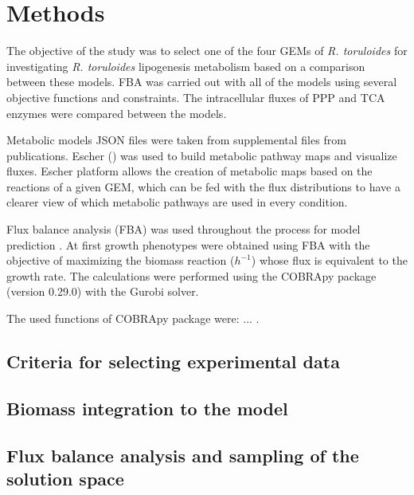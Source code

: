 \chapter{Methods}

The objective of the study was to select one of the four GEMs of \textit{R. toruloides} for investigating \textit{R. toruloides} lipogenesis metabolism
based on a comparison between these models. FBA was carried out with all of the models using several objective functions and constraints. The intracellular fluxes of PPP and TCA enzymes were compared between the models. 

Metabolic models JSON files were taken from supplemental
files from publications. %
Escher (\cite{King2015}) was used to build metabolic
pathway maps and visualize fluxes. Escher platform allows the creation of 
metabolic maps based on the reactions of a given GEM, which can be fed with the flux distributions to have a clearer view of which metabolic pathways are used in every condition.

Flux balance analysis (FBA) was used throughout the process for
model prediction \cite{Orth2010}. At first growth phenotypes
were obtained using FBA with the objective of maximizing the biomass
reaction ($h^{-1}$) whose flux is equivalent to the growth rate. The calculations were performed using the COBRApy
package (version 0.29.0) \cite{Ebrahim2013} with the Gurobi solver. %

The used functions of COBRApy package were: ... . 

\section{Criteria for selecting experimental data}

\section{Biomass integration to the model}

\section{Flux balance analysis and sampling of the solution space}







